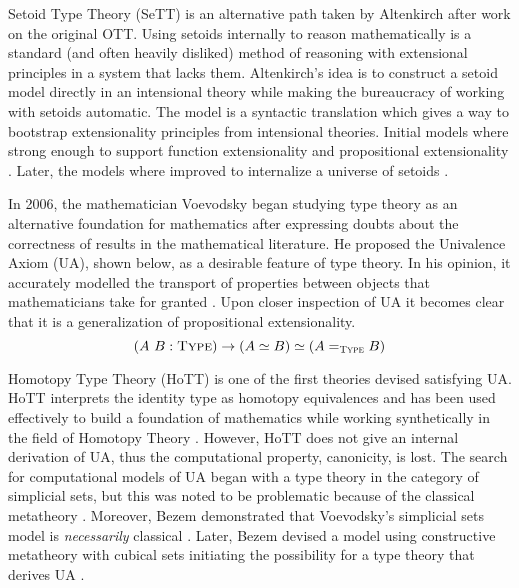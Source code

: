 Setoid Type Theory (SeTT) is an alternative path taken by Altenkirch after work on the original OTT.
Using setoids internally to reason mathematically is a standard (and often heavily disliked) method of reasoning with extensional principles in a system that lacks them.
Altenkirch's idea is to construct a setoid model directly in an intensional theory while making the bureaucracy of working with setoids automatic.
The model is a syntactic translation which gives a way to bootstrap extensionality principles from intensional theories.
Initial models where strong enough to support function extensionality and propositional extensionality \cite{altenkirch2019}.
Later, the models where improved to internalize a universe of setoids \cite{altenkirch2021}.

In 2006, the mathematician Voevodsky began studying type theory as an alternative foundation for mathematics after expressing doubts about the correctness of results in the mathematical literature.
He proposed the Univalence Axiom (UA), shown below, as a desirable feature of type theory.
In his opinion, it accurately modelled the transport of properties between objects that mathematicians take for granted \cite{voevodsky2006}.
Upon closer inspection of UA it becomes clear that it is a generalization of propositional extensionality.
$$(A\ B : \textsc{Type}) \to (A \simeq B) \simeq (A =_\textsc{Type} B)$$

Homotopy Type Theory (HoTT) is one of the first theories devised satisfying UA.
HoTT interprets the identity type as homotopy equivalences and has been used effectively to build a foundation of mathematics while working synthetically in the field of Homotopy Theory \cite{hottbook}.
However, HoTT does not give an internal derivation of UA, thus the computational property, canonicity, is lost.
The search for computational models of UA began with a type theory in the category of simplicial sets, but this was noted to be problematic because of the classical metatheory \cite{kapulkin2012}.
Moreover, Bezem demonstrated that Voevodsky's simplicial sets model is \textit{necessarily} classical \cite{bezem2015}.
Later, Bezem devised a model using constructive metatheory with cubical sets initiating the possibility for a type theory that derives UA \cite{bezem2014}.

